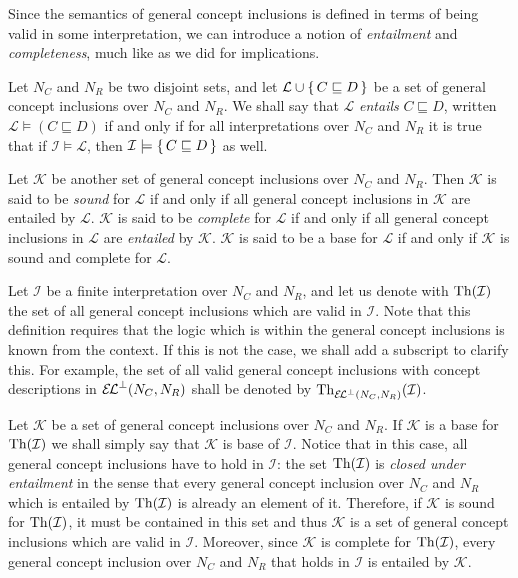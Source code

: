 Since the semantics of general concept inclusions is defined in terms of being valid in
some interpretation, we can introduce a notion of \emph{entailment} and
\emph{completeness}, much like as we did for implications.

\begin{Definition}
  \label{def:entailment-of-gcis}
  Let $N_C$ and $N_R$ be two disjoint sets, and let $\mathcal{L} \cup {\ensuremath{\{\, C \sqsubseteq
    D \,\}}}$ be a set of general concept inclusions over $N_C$ and $N_R$.  We shall say that
  $\mathcal{L}$ \emph{entails} $C \sqsubseteq D$, written $\mathcal{L} \models (C
  \sqsubseteq D)$ if and only if for all interpretations over $N_C$ and $N_R$ it is true
  that if $\mathcal{I} \models \mathcal{L}$, then $\mathcal{I} \models {\ensuremath{\{\, C \sqsubseteq
    D \,\}}}$ as well.

  Let $\mathcal{K}$ be another set of general concept inclusions over $N_C$ and $N_R$.
  Then $\mathcal{K}$ is said to be \emph{sound} for $\mathcal{L}$ if and only if all
  general concept inclusions in $\mathcal{K}$ are entailed by $\mathcal{L}$.
  $\mathcal{K}$ is said to be \emph{complete} for $\mathcal{L}$ if and only if all general
  concept inclusions in $\mathcal{L}$ are \emph{entailed} by $\mathcal{K}$.  $\mathcal{K}$
  is said to be a base for $\mathcal{L}$ if and only if $\mathcal{K}$ is sound and
  complete for $\mathcal{L}$.
\end{Definition}

Let $\mathcal{I}$ be a finite interpretation over $N_C$ and $N_R$, and let us denote with
$\operatorname{Th}(\mathcal{I})$ the set of all general concept inclusions which are valid in
$\mathcal{I}$.  Note that this definition requires that the logic which is within the
general concept inclusions is known from the context.  If this is not the case, we shall
add a subscript to clarify this.  For example, the set of all valid general concept
inclusions with concept descriptions in ${{\mathcal{E}\kern-.3ex\mathcal{L}}^\bot}(N_C, N_R)$ shall be denoted by
$\operatorname{Th}_{{{\mathcal{E}\kern-.3ex\mathcal{L}}^\bot}(N_C, N_R)}(\mathcal{I})$.

Let $\mathcal{K}$ be a set of general concept inclusions over $N_C$ and $N_R$.  If
$\mathcal{K}$ is a base for $\operatorname{Th}(\mathcal{I})$ we shall simply say that $\mathcal{K}$ is
base of $\mathcal{I}$.  Notice that in this case, all general concept inclusions have to
hold in $\mathcal{I}$: the set $\operatorname{Th}(\mathcal{I})$ is \emph{closed under entailment} in the
sense that every general concept inclusion over $N_C$ and $N_R$ which is entailed by
$\operatorname{Th}(\mathcal{I})$ is already an element of it.  Therefore, if $\mathcal{K}$ is sound for
$\operatorname{Th}(\mathcal{I})$, it must be contained in this set and thus $\mathcal{K}$ is a set of
general concept inclusions which are valid in $\mathcal{I}$.  Moreover, since
$\mathcal{K}$ is complete for $\operatorname{Th}(\mathcal{I})$, every general concept inclusion over
$N_C$ and $N_R$ that holds in $\mathcal{I}$ is entailed by $\mathcal{K}$.

